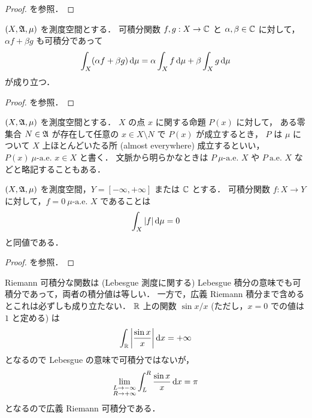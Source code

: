 \begin{proof}
    \cite[定理 12.1]{It63} を参照．
\end{proof}

\begin{theorem}
    $(X,\mathfrak{A},\mu)$ を測度空間とする．
    可積分関数 $f,g:X\to\mathbb{C}$ と $\alpha,\beta\in\mathbb{C}$ に対して，
    $\alpha f+\beta g$ も可積分であって
    \begin{align*}
        \int_X(\alpha f+\beta g)\,\mathrm{d}\mu
        =\alpha\int_Xf\,\mathrm{d}\mu+\beta\int_Xg\,\mathrm{d}\mu
    \end{align*}
    が成り立つ．
\end{theorem}

\begin{proof}
    \cite[定理 12.3, 系 1]{It63} を参照．
\end{proof}

\begin{definition}
    $(X,\mathfrak{A},\mu)$ を測度空間とする．
    $X$ の点 $x$ に関する命題 $P(x)$ に対して，
    ある零集合 $N\in\mathfrak{A}$ が存在して任意の $x\in X\setminus N$ で $P(x)$ が成立するとき，
    $P$ は $\mu$ について $X$ 上ほとんどいたる所 (almost everywhere) 成立するといい，
    $P(x)\ \textrm{$\mu$-a.e.\ $x\in X$}$ と書く．
    文脈から明らかなときは $P\ \textrm{$\mu$-a.e.\ $X$}$ や $P\ \textrm{a.e.\ $X$}$ などと略記することもある．
\end{definition}

\begin{theorem}
    $(X,\mathfrak{A},\mu)$ を測度空間，$Y=[-\infty,+\infty]$ または $\mathbb{C}$ とする．
    可積分関数 $f:X\to Y$ に対して，$f=0\ \textrm{$\mu$-a.e.\ $X$}$ であることは
    \begin{align*}
        \int_X|f|\,\mathrm{d}\mu=0
    \end{align*}
    と同値である．
\end{theorem}

\begin{proof}
    \cite[定理 12.3, 系 2]{It63} を参照．
\end{proof}

\begin{example}
    Riemann 可積分な関数は (Lebesgue 測度に関する) Lebesgue 積分の意味でも可積分であって，両者の積分値は等しい．
    一方で，広義 Riemann 積分まで含めるとこれは必ずしも成り立たない．
    $\mathbb{R}$ 上の関数 $\sin x/x$ (ただし，$x=0$ での値は $1$ と定める) は
    \begin{align*}
        \int_{\mathbb{R}}\left\lvert\frac{\sin x}{x}\right\rvert\mathrm{d} x=+\infty
    \end{align*}
    となるので Lebesgue の意味で可積分ではないが，
    \begin{align*}
        \lim_{\substack{L\to-\infty\\R\to+\infty}}\int_{L}^R\frac{\sin x}{x}\,\mathrm{d} x=\pi
    \end{align*}
    となるので広義 Riemann 可積分である．
\end{example}
